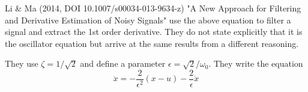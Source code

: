 \documentclass[11pt,a4paper]{article}
\begin{document}
Li \& Ma (2014, DOI 10.1007/s00034-013-9634-z) "A New Approach for Filtering and Derivative Estimation of Noisy Signals"
use the above equation to filter a signal and extract the 1st order derivative. They do not state explicitly that it is the oscillator equation but arrive at the same results from a different reasoning. 

They use $\zeta = 1/\sqrt{2}$ and define a parameter $\epsilon = \sqrt{2}/\omega_0$. They write the equation
\begin{equation}\label{key}
\ddot{x} = -\frac{2}{\epsilon^2} (x-u) - \frac{2}{\epsilon}\dot{x}
\end{equation}





	
\end{document}
